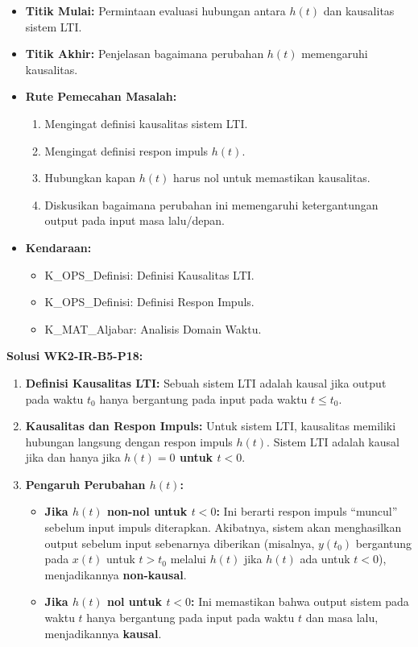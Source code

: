 \documentclass[
  letterpaper,
  DIV=11,
  numbers=noendperiod]{scrreprt}
\providecommand{\tightlist}{%
  \setlength{\itemsep}{0pt}\setlength{\parskip}{0pt}}
\begin{document}
\begin{itemize}
\tightlist
\item
  \textbf{Titik Mulai:} Permintaan evaluasi hubungan antara \(h(t)\) dan
  kausalitas sistem LTI.
\item
  \textbf{Titik Akhir:} Penjelasan bagaimana perubahan \(h(t)\)
  memengaruhi kausalitas.
\item
  \textbf{Rute Pemecahan Masalah:}

  \begin{enumerate}
  \def\labelenumi{\arabic{enumi}.}
  \tightlist
  \item
    Mengingat definisi kausalitas sistem LTI.
  \item
    Mengingat definisi respon impuls \(h(t)\).
  \item
    Hubungkan kapan \(h(t)\) harus nol untuk memastikan kausalitas.
  \item
    Diskusikan bagaimana perubahan ini memengaruhi ketergantungan output
    pada input masa lalu/depan.
  \end{enumerate}
\item
  \textbf{Kendaraan:}

  \begin{itemize}
  \tightlist
  \item
    K\_OPS\_Definisi: Definisi Kausalitas LTI.
  \item
    K\_OPS\_Definisi: Definisi Respon Impuls.
  \item
    K\_MAT\_Aljabar: Analisis Domain Waktu.
  \end{itemize}
\end{itemize}

\textbf{Solusi WK2-IR-B5-P18:}

\begin{enumerate}
\def\labelenumi{\arabic{enumi}.}
\tightlist
\item
  \textbf{Definisi Kausalitas LTI:} Sebuah sistem LTI adalah kausal jika
  output pada waktu \(t_0\) hanya bergantung pada input pada waktu
  \(t \le t_0\).
\item
  \textbf{Kausalitas dan Respon Impuls:} Untuk sistem LTI, kausalitas
  memiliki hubungan langsung dengan respon impuls \(h(t)\). Sistem LTI
  adalah kausal jika dan hanya jika \textbf{\(h(t) = 0\) untuk
  \(t < 0\)}.
\item
  \textbf{Pengaruh Perubahan \(h(t)\):}

  \begin{itemize}
  \tightlist
  \item
    \textbf{Jika \(h(t)\) non-nol untuk \(t < 0\):} Ini berarti respon
    impuls ``muncul'' sebelum input impuls diterapkan. Akibatnya, sistem
    akan menghasilkan output sebelum input sebenarnya diberikan
    (misalnya, \(y(t_0)\) bergantung pada \(x(t)\) untuk \(t > t_0\)
    melalui \(h(t)\) jika \(h(t)\) ada untuk \(t < 0\)), menjadikannya
    \textbf{non-kausal}.
  \item
    \textbf{Jika \(h(t)\) nol untuk \(t < 0\):} Ini memastikan bahwa
    output sistem pada waktu \(t\) hanya bergantung pada input pada
    waktu \(t\) dan masa lalu, menjadikannya \textbf{kausal}.
  \end{itemize}
\end{enumerate}
\end{document}
